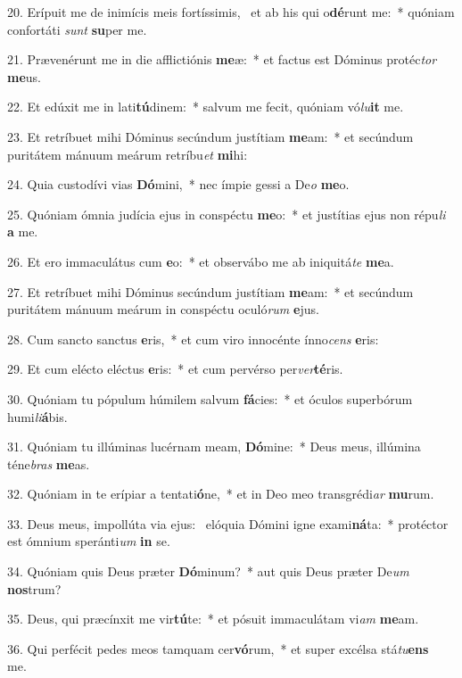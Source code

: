 20. Erípuit me de inimícis meis fortíssimis, \dag\  et ab his qui o\textbf{dé}runt me:~*  quóniam confortáti \textit{sunt} \textbf{su}per me.\

21. Prævenérunt me in die afflictiónis \textbf{me}æ:~*  et factus est Dóminus protéc\textit{tor} \textbf{me}us.\

22. Et edúxit me in lati\textbf{tú}dinem:~*  salvum me fecit, quóniam vó\textit{lu}\textbf{it} me.\

23. Et retríbuet mihi Dóminus secúndum justítiam \textbf{me}am:~*  et secúndum puritátem mánuum meárum retríbu\textit{et} \textbf{mi}hi:\

24. Quia custodívi vias \textbf{Dó}mini,~*  nec ímpie gessi a De\textit{o} \textbf{me}o.\

25. Quóniam ómnia judícia ejus in conspéctu \textbf{me}o:~*  et justítias ejus non répu\textit{li} \textbf{a} me.\

26. Et ero immaculátus cum \textbf{e}o:~*  et observábo me ab iniquitá\textit{te} \textbf{me}a.\

27. Et retríbuet mihi Dóminus secúndum justítiam \textbf{me}am:~*  et secúndum puritátem mánuum meárum in conspéctu oculó\textit{rum} \textbf{e}jus.\

28. Cum sancto sanctus \textbf{e}ris,~*  et cum viro innocénte ínno\textit{cens} \textbf{e}ris:\

29. Et cum elécto eléctus \textbf{e}ris:~*  et cum pervérso per\textit{ver}\textbf{té}ris.\

30. Quóniam tu pópulum húmilem salvum \textbf{fá}cies:~*  et óculos superbórum humi\textit{li}\textbf{á}bis.\

31. Quóniam tu illúminas lucérnam meam, \textbf{Dó}mine:~*  Deus meus, illúmina téne\textit{bras} \textbf{me}as.\

32. Quóniam in te erípiar a tentati\textbf{ó}ne,~*  et in Deo meo transgrédi\textit{ar} \textbf{mu}rum.\

33. Deus meus, impollúta via ejus: \dag\  elóquia Dómini igne exami\textbf{ná}ta:~*  protéctor est ómnium speránti\textit{um} \textbf{in} se.\

34. Quóniam quis Deus præter \textbf{Dó}minum?~*  aut quis Deus præter De\textit{um} \textbf{nos}trum?\

35. Deus, qui præcínxit me vir\textbf{tú}te:~*  et pósuit immaculátam vi\textit{am} \textbf{me}am.\

36. Qui perfécit pedes meos tamquam cer\textbf{vó}rum,~*  et super excélsa stá\textit{tu}\textbf{ens} me.\

